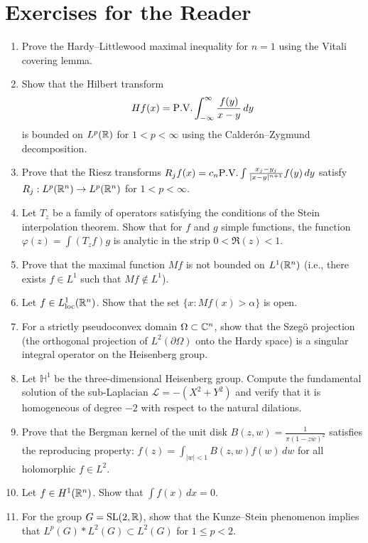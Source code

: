 \section*{Exercises for the Reader}

\begin{enumerate}
    \item [B] Prove the Hardy--Littlewood maximal inequality for \(n = 1\) using the Vitali covering lemma.
    \item [I] Show that the Hilbert transform
    \[
    Hf(x) = \PV \int_{-\infty}^\infty \frac{f(y)}{x-y}\,dy
    \]
    is bounded on \(L^p(\mathbb{R})\) for \(1 < p < \infty\) using the Calder\'on--Zygmund decomposition.
    \item [I] Prove that the Riesz transforms \(R_j f(x) = c_n \PV \int \frac{x_j - y_j}{|x-y|^{n+1}} f(y)\,dy\) satisfy \(R_j: L^p(\mathbb{R}^n) \to L^p(\mathbb{R}^n)\) for \(1 < p < \infty\).
    \item [A] Let \(T_z\) be a family of operators satisfying the conditions of the Stein interpolation theorem. Show that for \(f\) and \(g\) simple functions, the function \(\varphi(z) = \int (T_z f) g\) is analytic in the strip \(0 < \Re(z) < 1\).
    \item [B] Prove that the maximal function \(Mf\) is not bounded on \(L^1(\mathbb{R}^n)\) (i.e., there exists \(f \in L^1\) such that \(Mf \notin L^1\)).
    \item [B] Let \(f \in L^1_{\text{loc}}(\mathbb{R}^n)\). Show that the set \(\{x : Mf(x) > \alpha\}\) is open.
    \item [A] For a strictly pseudoconvex domain \(\Omega \subset \mathbb{C}^n\), show that the Szeg\"o projection (the orthogonal projection of \(L^2(\partial\Omega)\) onto the Hardy space) is a singular integral operator on the Heisenberg group.
    \item [A] Let \(\mathbb{H}^1\) be the three-dimensional Heisenberg group. Compute the fundamental solution of the sub-Laplacian \(\mathcal{L} = -(X^2 + Y^2)\) and verify that it is homogeneous of degree \(-2\) with respect to the natural dilations.
    \item [B] Prove that the Bergman kernel of the unit disk \(B(z,w) = \frac{1}{\pi(1 - z\overline{w})^2}\) satisfies the reproducing property: \(f(z) = \int_{|w|<1} B(z,w) f(w)\,dw\) for all holomorphic \(f \in L^2\).
    \item [B] Let \(f \in H^1(\mathbb{R}^n)\). Show that \(\int f(x)\,dx = 0\).
    \item [A] For the group \(G = \operatorname{SL}(2,\mathbb{R})\), show that the Kunze--Stein phenomenon implies that \(L^p(G) * L^2(G) \subset L^2(G)\) for \(1 \leq p < 2\).

\end{enumerate}
